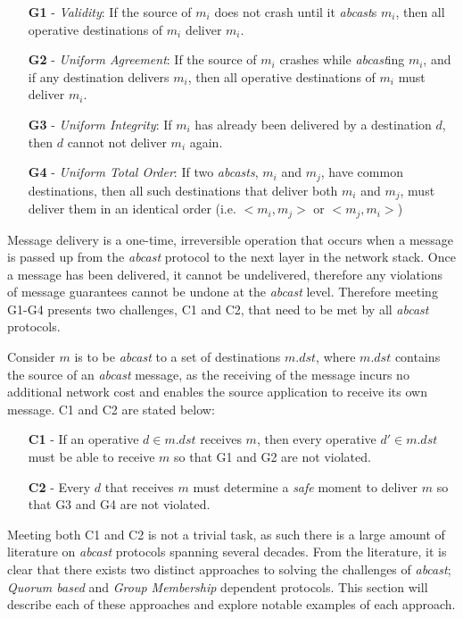 \begin{itemize}
    \item [\textbf{G1}] - \emph{Validity}: If the source of $m_i$ does not crash until it \emph{abcast}s $m_i$, then all operative destinations of $m_i$ deliver $m_i$.
    \item [\textbf{G2}] - \emph{Uniform Agreement}: If the source of $m_i$ crashes while \emph{abcast}ing $m_i$, and if any destination delivers $m_i$, then all operative
destinations of $m_i$ must deliver $m_i$.
    \item [\textbf{G3}] - \emph{Uniform Integrity}: If $m_i$ has already been delivered by a destination $d$, then $d$ cannot not deliver $m_i$ again.  
    \item [\textbf{G4}] - \emph{Uniform Total Order}: If two \emph{\emph{abcast}s}, $m_i$ and $m_j$, have
common destinations, then all such destinations that deliver both $m_i$ and $m_j$, must deliver them in an identical order (i.e. $<m_i, m_j>$ or $<m_j, m_i>$)
\end{itemize}

Message delivery is a one-time, irreversible operation that occurs when a message is passed up from the \emph{abcast} protocol to the next layer in the network stack. Once a message has been delivered, it cannot be undelivered, therefore any violations of message guarantees cannot be undone at the \emph{abcast} level.  Therefore meeting G1-G4 presents two challenges, C1 and C2, that need to be met by all \emph{abcast} protocols.

Consider $m$ is to be \emph{abcast} to a set of destinations $m.dst$, where $m.dst$ contains the source of an \emph{abcast} message, as the receiving of the message incurs no additional network cost and enables the source application to receive its own message.  C1 and C2 are stated below:
\begin{itemize}
    \item[\textbf{C1}] - If an operative $d \in m.dst$ receives $m$, then every operative
     $d' \in m.dst$ must be able to receive $m$ so that G1 and G2 are not violated.
    \item[\textbf{C2}] - Every $d$ that receives $m$ must determine a \emph{safe} moment
to deliver $m$ so that G3 and G4 are not violated.
\end{itemize}

Meeting both C1 and C2 is not a trivial task, as such there is a large amount of literature\cite{Defago:2004:TOB:1041680.1041682} on \emph{abcast} protocols spanning several decades.  From the literature, it is clear that there exists two distinct approaches to solving the challenges of \emph{abcast}; \emph{Quorum based} and \emph{Group Membership} dependent protocols.  This section will describe each of these approaches and explore notable examples of each approach.  
	
